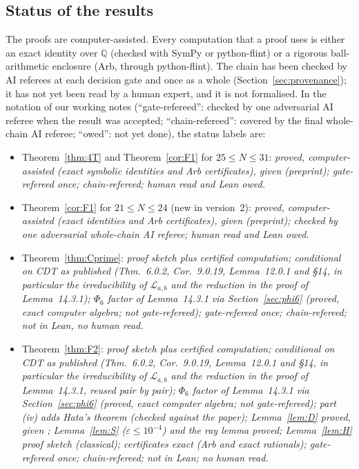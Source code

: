 \documentclass[11pt]{amsart}
\theoremstyle{definition}
\theoremstyle{remark}
\numberwithin{equation}{section}
\newcommand{\QQ}{\mathbb{Q}}
\begin{document}
\subsection{Status of the results}\label{sec:status}
The proofs are computer-assisted. Every computation that a proof uses is either an exact identity over $\QQ$ (checked
with SymPy or python-flint) or a rigorous ball-arithmetic enclosure (Arb, through python-flint). The chain has been
checked by AI referees at each decision gate and once as a whole (Section~\ref{sec:provenance}); it has not yet been
read by a human expert, and it is not formalised. In the notation of our working notes (``gate-refereed'': checked by one
adversarial AI referee when the result was accepted; ``chain-refereed'': covered by the final whole-chain AI referee;
``owed'': not yet done), the status labels are:
\begin{itemize}
\item Theorem~\ref{thm:4T} and Theorem~\ref{cor:F1} for $25\le N\le31$: \emph{proved, computer-assisted (exact symbolic
identities and Arb certificates), given \cite[Thm.~7.0.1]{CDT} (preprint); gate-refereed once; chain-refereed; human
read and Lean owed.}
\item Theorem~\ref{cor:F1} for $21\le N\le24$ (new in version~2): \emph{proved, computer-assisted (exact identities and
Arb certificates), given \cite[Thm.~7.0.1]{CDT} (preprint); checked by one adversarial whole-chain AI referee; human
read and Lean owed.}
\item Theorem~\ref{thm:Cprime}: \emph{proof sketch plus certified computation; conditional on CDT as published
(Thm.~6.0.2, Cor.~9.0.19, Lemma~12.0.1 and \S14, in particular the irreducibility of $\mathcal L_{a,b}$ and the
reduction in the proof of Lemma~14.3.1); $\Phi_6$ factor of Lemma~14.3.1 via Section~\ref{sec:phi6} (proved, exact
computer algebra; not gate-refereed); gate-refereed once; chain-refereed; not in Lean, no human read.}
\item Theorem~\ref{thm:F2}: \emph{proof sketch plus certified computation; conditional on CDT as published (Thm.~6.0.2,
Cor.~9.0.19, Lemma~12.0.1 and \S14, in particular the irreducibility of $\mathcal L_{a,b}$ and the reduction in the
proof of Lemma~14.3.1, reused pair by pair); $\Phi_6$ factor of Lemma~14.3.1 via Section~\ref{sec:phi6} (proved, exact
computer algebra; not gate-refereed); part (iv) adds Hata's theorem \cite[Cor.~6.3]{Hat98} (checked against the paper); Lemma~\ref{lem:D} proved,
given \cite[Lemma~14.2.4]{CDT}; Lemma~\ref{lem:S} ($\varepsilon\le10^{-4}$) and the ray lemma proved;
Lemma~\ref{lem:H} proof sketch (classical); certificates exact (Arb and exact rationals); gate-refereed once;
chain-refereed; not in Lean; no human read.}
\end{itemize}
\end{document}
